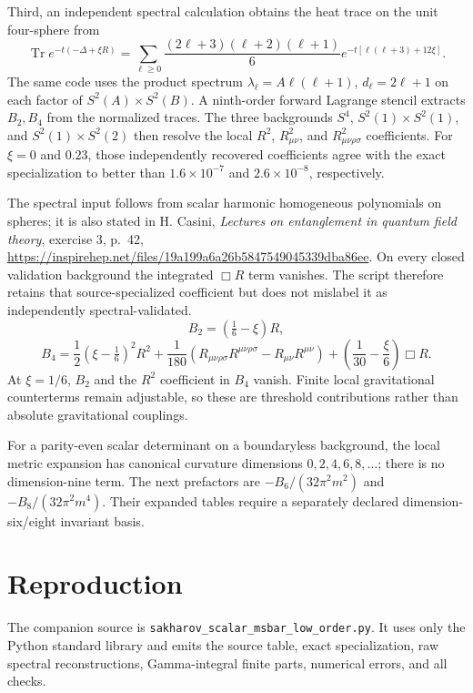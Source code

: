 \documentclass[11pt]{article}
\begin{document}
Third, an independent spectral calculation obtains the heat trace on the
unit four-sphere from
\[
 \operatorname{Tr}e^{-t(-\Delta+\xi R)}
 =\sum_{\ell\geq0}\frac{(2\ell+3)(\ell+2)(\ell+1)}6
 e^{-t[\ell(\ell+3)+12\xi]}.
\]
The same code uses the product spectrum
$\lambda_\ell=A\ell(\ell+1)$, $d_\ell=2\ell+1$ on each factor of
$S^2(A)\mathbin{\times}S^2(B)$. A ninth-order forward Lagrange stencil
extracts $B_2,B_4$ from the normalized traces. The three backgrounds
$S^4$, $S^2(1)\mathbin{\times}S^2(1)$, and
$S^2(1)\mathbin{\times}S^2(2)$ then resolve the local $R^2$,
$R_{\mu\nu}^2$, and $R_{\mu\nu\rho\sigma}^2$ coefficients. For
$\xi=0$ and $0.23$, those independently recovered coefficients agree with
the exact specialization to better than $1.6\times10^{-7}$ and
$2.6\times10^{-8}$, respectively.

The spectral input follows from scalar harmonic homogeneous polynomials on
spheres; it is also stated in H. Casini, \emph{Lectures on entanglement in
quantum field theory}, exercise 3, p.~42,
\url{https://inspirehep.net/files/19a199a6a26b5847549045339dba86ee}.
On every closed validation background the integrated $\Box R$ term vanishes.
The script therefore retains that source-specialized coefficient but does not
mislabel it as independently spectral-validated.
\[
 B_2=(\tfrac16-\xi)R,
\]
\[
 B_4=\frac12(\xi-\tfrac16)^2R^2
 +\frac1{180}(R_{\mu\nu\rho\sigma}R^{\mu\nu\rho\sigma}
 -R_{\mu\nu}R^{\mu\nu})
 +\left(\frac1{30}-\frac{\xi}{6}\right)\Box R.
\]
At $\xi=1/6$, $B_2$ and the $R^2$ coefficient in $B_4$ vanish.
Finite local gravitational counterterms remain adjustable, so these are
threshold contributions rather than absolute gravitational couplings.

For a parity-even scalar determinant on a boundaryless background, the local
metric expansion has canonical curvature dimensions $0,2,4,6,8,\ldots$;
there is no dimension-nine term. The next prefactors are
$-B_6/(32\pi^2m^2)$ and $-B_8/(32\pi^2m^4)$. Their expanded tables require a
separately declared dimension-six/eight invariant basis.

\section*{Reproduction}
The companion source is
\texttt{sakharov\_scalar\_msbar\_low\_order.py}. It uses only the Python
standard library and emits the source table, exact specialization, raw
spectral reconstructions, Gamma-integral finite parts, numerical errors, and
all checks.
\end{document}
